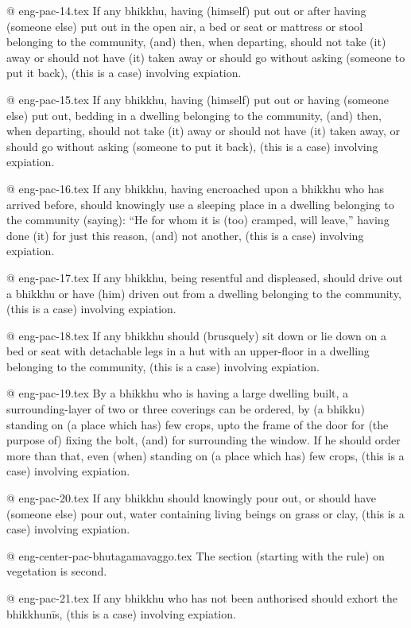 @ eng-pac-14.tex
If any bhikkhu, having (himself) put out or after having (someone else) put out in the open air, a bed or seat or mattress or stool belonging to the community, (and) then, when departing, should not take (it) away or should not have (it) taken away or should go without asking (someone to put it back), (this is a case) involving expiation.

@ eng-pac-15.tex
If any bhikkhu, having (himself) put out or having (someone else) put out, bedding in a dwelling belonging to the community, (and) then, when departing, should not take (it) away or should not have (it) taken away, or should go without asking (someone to put it back), (this is a case) involving expiation.

@ eng-pac-16.tex
If any bhikkhu, having encroached upon a bhikkhu who has arrived before, should knowingly use a sleeping place in a dwelling belonging to the community (saying): “He for whom it is (too) cramped, will leave,” having done (it) for just this reason, (and) not another, (this is a case) involving expiation.

@ eng-pac-17.tex
If any bhikkhu, being resentful and displeased, should drive out a bhikkhu or have (him) driven out from a dwelling belonging to the community, (this is a case) involving expiation.

@ eng-pac-18.tex
If any bhikkhu should (brusquely) sit down or lie down on a bed or seat with detachable legs in a hut with an upper-floor in a dwelling belonging to the community, (this is a case) involving expiation.

@ eng-pac-19.tex
By a bhikkhu who is having a large dwelling built, a surrounding-layer of two or three coverings can be ordered, by (a bhikku) standing on (a place which has) few crops, upto the frame of the door for (the purpose of) fixing the bolt, (and) for surrounding the window. If he should order more than that, even (when) standing on (a place which has) few crops, (this is a case) involving expiation.

@ eng-pac-20.tex
If any bhikkhu should knowingly pour out, or should have (someone else) pour out, water containing living beings on grass or clay, (this is a case) involving expiation.

@ eng-center-pac-bhutagamavaggo.tex
The section (starting with the rule) on vegetation is second.

@ eng-pac-21.tex
If any bhikkhu who has not been authorised should exhort the bhikkhunīs, (this is a case) involving expiation.


